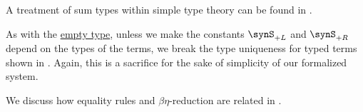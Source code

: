 \begin{comments}
  \item A treatment of sum types within simple type theory can be found in \cite[\S 4.3.3]{Mimram2020ProgramEqualsProof}.

  \item As with the \hyperref[def:empty_type]{empty type}, unless we make the constants \( \synS_{+L} \) and \( \synS_{+R} \) depend on the types of the terms, we break the type uniqueness for typed terms shown in . Again, this is a sacrifice for the sake of simplicity of our formalized system.

  \item We discuss how equality rules and \( \beta\eta \)-reduction are related in .
\end{comments}

